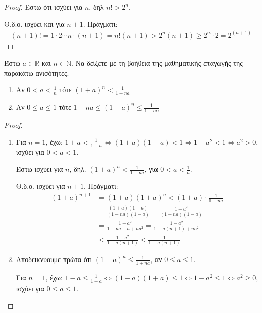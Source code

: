 \documentclass[a4paper,table]{report}
\begin{document}
\begin{multicols}{2}
\begin{enumerate}
\begin{proof}
      Έστω ότι ισχύει για $n$, δηλ $ n! >2^{n} $. 

      Θ.δ.ο. ισχύει και για $ n+1 $. Πράγματι:
      \begin{align*} (n+1)! = 1 \cdot 2 \cdots n \cdot (n+1)  
        =n!(n+1) > 2^{n}(n+1) \geq 2^{n}\cdot 2 = 2^{(n+1)}
      \end{align*}
    \end{proof}

  \item \textcolor{Col1}{Έστω $ a \in \mathbb{R} $ και $ n \in \mathbb{N}$.
      Να δείξετε με τη βοήθεια της μαθηματικής επαγωγής της 
      παρακάτω ανισότητες.
      \begin{enumerate}
        \item Αν $ 0<a< \frac{1}{n} $ τότε $ (1+a)^{n} < \frac{1}{1-na} $
        \item Αν $ 0 \leq a \leq 1$  τότε $ 1-na \leq (1-a)^{n} \leq
          \frac{1}{1+na} $
    \end{enumerate}}
    \begin{proof}
    \item {}
      \begin{enumerate}
        \item Για $ n=1 $, έχω: $ 1+a < \frac{1}{1-a} 
          \Leftrightarrow (1+a)(1-a) < 1 
          \Leftrightarrow 1-a^{2} <1 \Leftrightarrow a^{2} > 0  $,
          ισχύει για $ 0<a<1 $.

          Έστω ισχύει για $ n $, δηλ. $ (1+a)^{n} < \frac{1}{1-na}
          $, για $ 0 < a < \frac{1}{n} $.

          Θ.δ.ο. ισχύει για $ n+1 $. Πράγματι:
          \begin{align*}
            (1+a)^{n+1} 
            &= (1+a)(1+a)^{n} < (1+a)\cdot \frac{1}{1-na} \\
            &= \frac{(1+a)(1-a)}{(1-na)(1-a)}= \frac{1-a^{2}}{(1-na)(1-a)} \\ 
            &= \frac{1-a^{2}}{1-na-a+na^{2}} = \frac{1-a^{2}}{1-a(n+1)+na^{2}} \\
            &< \frac{1-a^{2}}{1-a(n+1)} < \frac{1}{1-a(n+1)} 
          \end{align*}
        \item Αποδεικνύουμε πρώτα ότι $ (1-a)^{n} \leq \frac{1}{1+na}$,
          αν $ 0 \leq a \leq 1 $.

          Για $ n=1 $, έχω: $ 1-a \leq \frac{1}{1+a} 
          \Leftrightarrow (1-a)(1+a) \leq 1 \Leftrightarrow 
          1-a^{2} \leq 1 \Leftrightarrow a^{2} \geq 0  $, ισχύει
          για $ 0 \leq a \leq 1 $. 


\end{enumerate}
\end{proof}
\end{enumerate}
\end{multicols}
\end{document}
